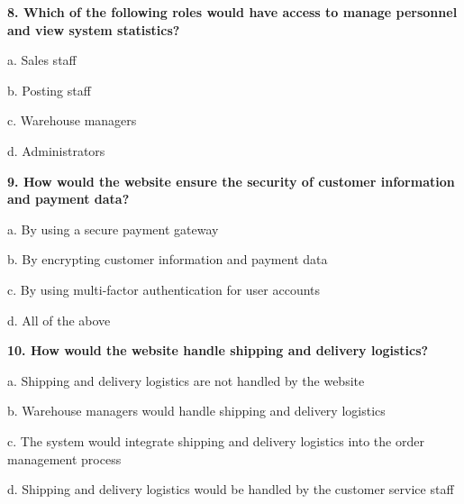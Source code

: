 \textbf{8. Which of the following roles would have access to manage personnel and view system statistics?}

a. Sales staff

b. Posting staff

c. Warehouse managers

d. Administrators

\medskip

\textbf{9. How would the website ensure the security of customer information and payment data?}

a. By using a secure payment gateway

b. By encrypting customer information and payment data

c. By using multi-factor authentication for user accounts

d. All of the above

\medskip

\textbf{10. How would the website handle shipping and delivery logistics?}

a. Shipping and delivery logistics are not handled by the website

b. Warehouse managers would handle shipping and delivery logistics

c. The system would integrate shipping and delivery logistics into the order management process

d. Shipping and delivery logistics would be handled by the customer service staff
